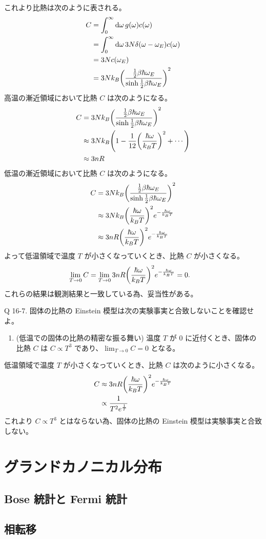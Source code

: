 \documentclass[uplatex,dvipdfmx,a4paper,11pt]{jlreq}
\theoremstyle{definition}
\begin{document}
これより比熱は次のように表される。
\begin{align}
  C & = \int_0^\infty\dd{\omega}g(\omega)c(\omega)                                            \\
    & = \int_0^\infty\dd{\omega}3N\delta(\omega - \omega_E)c(\omega)                          \\
    & = 3Nc(\omega_E)                                                                         \\
    & = 3Nk_B\qty(\frac{\frac{1}{2}\beta\hbar\omega_E}{\sinh\frac{1}{2}\beta\hbar\omega_E})^2
\end{align}
高温の漸近領域において比熱 $C$ は次のようになる。
\begin{align}
  C & = 3Nk_B\qty(\frac{\frac{1}{2}\beta\hbar\omega_E}{\sinh\frac{1}{2}\beta\hbar\omega_E})^2 \\
    & \approx 3Nk_B\qty(1 - \frac{1}{12}\qty(\frac{\hbar\omega}{k_BT})^2 + \cdots)            \\
    & \approx 3nR
\end{align}
低温の漸近領域において比熱 $C$ は次のようになる。
\begin{align}
  C & = 3Nk_B\qty(\frac{\frac{1}{2}\beta\hbar\omega_E}{\sinh\frac{1}{2}\beta\hbar\omega_E})^2 \\
    & \approx 3Nk_B\qty(\frac{\hbar\omega}{k_BT})^2e^{-\frac{\hbar\omega}{k_BT}}              \\
    & \approx 3nR\qty(\frac{\hbar\omega}{k_BT})^2e^{-\frac{\hbar\omega}{k_BT}}
\end{align}
よって低温領域で温度 $T$ が小さくなっていくとき、比熱 $C$ が小さくなる。
\begin{align}
  \lim_{T\to 0} C & = \lim_{T\to 0}3nR\qty(\frac{\hbar\omega}{k_BT})^2e^{-\frac{\hbar\omega}{k_BT}} = 0.
\end{align}
これらの結果は観測結果と一致している為、妥当性がある。

\begin{itembox}[l]{Q 16-7.}
  固体の比熱の Einstein 模型は次の実験事実と合致しないことを確認せよ。
  \begin{enumerate}
    \item (低温での固体の比熱の精密な振る舞い) 温度 $T$ が $0$ に近付くとき、固体の比熱 $C$ は $C \propto T^3$ であり、$\lim_{T\to 0} C = 0$ となる。
  \end{enumerate}
\end{itembox}
低温領域で温度 $T$ が小さくなっていくとき、比熱 $C$ は次のように小さくなる。
\begin{align}
  C & \approx 3nR\qty(\frac{\hbar\omega}{k_BT})^2e^{-\frac{\hbar\omega}{k_BT}} \\
    & \propto \frac{1}{T^{2}e^{\frac{1}{T}}}
\end{align}
これより $C \propto T^3$ とはならない為、固体の比熱の Einstein 模型は実験事実と合致しない。

\section{グランドカノニカル分布}

\subsection{Bose 統計と Fermi 統計}


\subsection{相転移}
\end{document}
